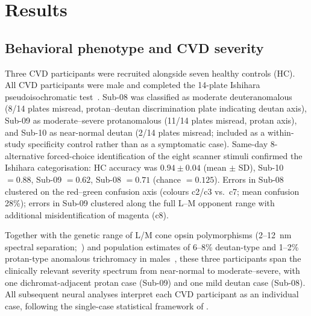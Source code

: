 %

\section{Results}
\label{sec:results}

\subsection{Behavioral phenotype and CVD severity}
\label{sec:results:behavior}

Three CVD participants were recruited alongside seven healthy controls
(HC). All CVD participants were male and completed the 14-plate Ishihara
pseudoisochromatic test~\citep{ishihara1917}. Sub-08 was classified as
moderate deuteranomalous (8/14 plates misread, protan--deutan
discrimination plate indicating deutan axis), Sub-09 as moderate--severe
protanomalous (11/14 plates misread, protan axis), and Sub-10 as
near-normal deutan (2/14 plates misread; included as a within-study
specificity control rather than as a symptomatic case). Same-day
8-alternative forced-choice identification of the eight scanner stimuli
confirmed the Ishihara categorisation: HC accuracy was
$0.94 \pm 0.04$ (mean $\pm$ SD), Sub-10 $= 0.88$, Sub-09 $= 0.62$,
Sub-08 $= 0.71$ (chance $= 0.125$). Errors in Sub-08 clustered on the
red--green confusion axis (colours c2/c3 vs.\ c7; mean confusion 28\%);
errors in Sub-09 clustered along the full L--M opponent range with
additional misidentification of magenta (c8).

Together with the genetic range of L/M cone opsin polymorphisms
(2--12~nm spectral separation;~\citealp{neitz2011, deeb2005}) and
population estimates of 6--8\% deutan-type and 1--2\% protan-type
anomalous trichromacy in males~\citep{bosten2019}, these three
participants span the clinically relevant severity spectrum from
near-normal to moderate--severe, with one dichromat-adjacent protan case
(Sub-09) and one mild deutan case (Sub-08). All subsequent neural
analyses interpret each CVD participant as an individual case, following
the single-case statistical framework of \citet{crawford1998}.

